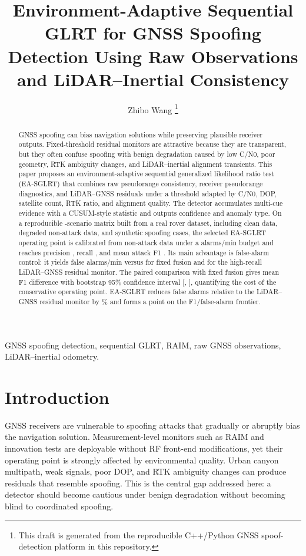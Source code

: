 \documentclass[journal]{IEEEtran}
\title{Environment-Adaptive Sequential GLRT for GNSS Spoofing Detection Using Raw Observations and LiDAR--Inertial Consistency}
\author{Zhibo Wang%
\thanks{This draft is generated from the reproducible C++/Python GNSS spoof-detection platform in this repository.}}
\begin{document}
\maketitle

\begin{abstract}
GNSS spoofing can bias navigation solutions while preserving plausible receiver outputs.
Fixed-threshold residual monitors are attractive because they are transparent, but they often confuse spoofing with benign degradation caused by low C/N0, poor geometry, RTK ambiguity changes, and LiDAR--inertial alignment transients.
This paper proposes an environment-adaptive sequential generalized likelihood ratio test (EA-SGLRT) that combines raw pseudorange consistency, receiver pseudorange diagnostics, and LiDAR--GNSS residuals under a threshold adapted by C/N0, DOP, satellite count, RTK ratio, and alignment quality.
The detector accumulates multi-cue evidence with a CUSUM-style statistic and outputs confidence and anomaly type.
On a reproducible \MatrixScenarioCount{}-scenario matrix built from a real rover dataset, including clean data, degraded non-attack data, and \MatrixAttackScenarioCount{} synthetic spoofing cases, the selected EA-SGLRT operating point is calibrated from non-attack data under a \AdaptiveSeqFaBudget{} alarms/min budget and reaches precision \AdaptiveSeqPrecision{}, recall \AdaptiveSeqRecall{}, and mean attack F1 \AdaptiveSeqFone{}.
Its main advantage is false-alarm control: it yields \AdaptiveSeqFalseAlarm{} false alarms/min versus \FixedFusedMatrixFalseAlarm{} for fixed fusion and \LioResidualFalseAlarm{} for the high-recall LiDAR--GNSS residual monitor.
The paired comparison with fixed fusion gives mean F1 difference \AdaptiveVsFixedFoneGain{} with bootstrap 95\% confidence interval [\AdaptiveVsFixedCiLow{}, \AdaptiveVsFixedCiHigh{}], quantifying the cost of the conservative operating point.
EA-SGLRT reduces false alarms relative to the LiDAR--GNSS residual monitor by \AdaptiveVsLioFalseAlarmReductionPercent{}\% and forms a \AdaptiveParetoStatus{} point on the F1/false-alarm frontier.
\end{abstract}

\begin{IEEEkeywords}
GNSS spoofing detection, sequential GLRT, RAIM, raw GNSS observations, LiDAR--inertial odometry.
\end{IEEEkeywords}

\section{Introduction}
GNSS receivers are vulnerable to spoofing attacks that gradually or abruptly bias the navigation solution.
Measurement-level monitors such as RAIM and innovation tests are deployable without RF front-end modifications, yet their operating point is strongly affected by environmental quality.
Urban canyon multipath, weak signals, poor DOP, and RTK ambiguity changes can produce residuals that resemble spoofing.
This is the central gap addressed here: a detector should become cautious under benign degradation without becoming blind to coordinated spoofing.
\end{document}
